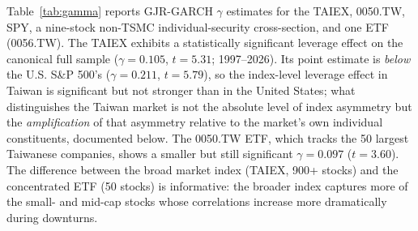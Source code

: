 Table~\ref{tab:gamma} reports GJR-GARCH $\gamma$ estimates for the TAIEX, 0050.TW, SPY, a nine-stock non-TSMC individual-security cross-section, and one ETF (0056.TW). The TAIEX exhibits a statistically significant leverage effect on the canonical full sample ($\gamma = 0.105$, $t = 5.31$; 1997--2026). Its point estimate is \emph{below} the U.S. S\&P 500's ($\gamma = 0.211$, $t = 5.79$), so the index-level leverage effect in Taiwan is significant but not stronger than in the United States; what distinguishes the Taiwan market is not the absolute level of index asymmetry but the \emph{amplification} of that asymmetry relative to the market's own individual constituents, documented below. The 0050.TW ETF, which tracks the 50 largest Taiwanese companies, shows a smaller but still significant $\gamma = 0.097$ ($t = 3.60$). The difference between the broad market index (TAIEX, 900+ stocks) and the concentrated ETF (50 stocks) is informative: the broader index captures more of the small- and mid-cap stocks whose correlations increase more dramatically during downturns.

